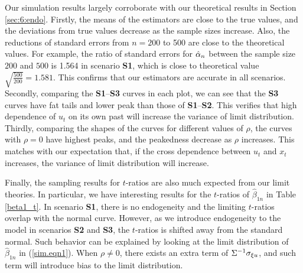 Our simulation results largely corroborate with our theoretical results in Section \ref{sec:6:endo}. Firstly, the means of the estimators are close to the true values, and the deviations from true values decrease as the sample sizes increase. Also, the reductions of standard errors from $n = 200$ to 500 are close to the theoretical values. For example, the ratio of standard errors for $\hat{\alpha}_n$ between the sample size $200$ and $500$ is 1.564 in scenario {\bf S1}, which is close to theoretical value $\sqrt{\frac{500}{200}} = 1.581$. This confirms that our estimators are accurate in all scenarios. Secondly, comparing the {\bf S1}--{\bf S3} curves in each plot, we can see that the {\bf S3} curves have fat tails and lower peak than those of {\bf S1}--{\bf S2}. This verifies that high dependence of $u_t$ on its own past will increase the variance of limit distribution. Thirdly, comparing the shapes of the curves for different values of $\rho$, the curves with $\rho = 0$ have highest peaks, and the peakedness decrease as $\rho$ increases. This matches with our expectation that, if the cross dependence between $u_t$ and $x_t$ increases, the variance of limit distribution will increase.

Finally, the sampling results for $t$-ratios are also much expected from our limit theories. In particular, we have interesting results for the $t$-ratios of $\hat{\beta}_{1n}$ in Table \ref{beta1_t}. In scenario {\bf S1}, there is no endogeneity and the limiting $t$-ratios overlap with the normal curve. However, as we introduce endogeneity to the model in scenarios {\bf S2} and {\bf S3}, the $t$-ratios is shifted away from the standard normal. Such behavior can be explained by looking at the limit distribution of $\hat{\beta}_{1n}$ in (\ref{sim.eqn1}). When $\rho \ne 0$, there exists an extra term of $ \Sigma^{-1} \sigma_{\xi u}$, and such term will introduce bias to the limit distribution.



